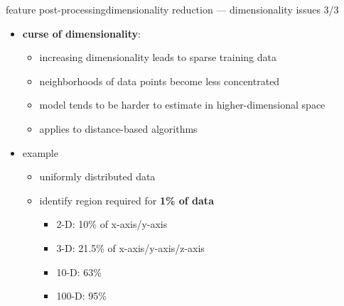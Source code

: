 		\begin{frame}{feature post-processing}{dimensionality reduction --- dimensionality issues 3/3}
            \begin{itemize}
                \item \textbf{curse of dimensionality}: 
                    \begin{itemize}
                        \item   increasing dimensionality leads to sparse training data
                        \item   neighborhoods of data points become less concentrated
                        \item   model tends to be harder to estimate in higher-dimensional space
                        \item   applies to distance-based algorithms
                    \end{itemize}
                \item   example
                    \begin{itemize}
                        \item   uniformly distributed data 
                        \item   identify region required for \textbf{1\% of data}
                            \begin{itemize}
                                \item   2-D: 10\% of x-axis/y-axis
                                \item   3-D: 21.5\% of x-axis/y-axis/z-axis
                                \item   10-D: 63\%
                                \item   100-D: 95\%
                            \end{itemize}
                    \end{itemize}
            \end{itemize}
		\end{frame}
